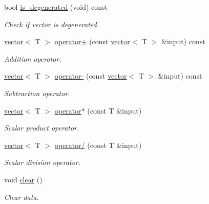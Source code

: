 \begin{DoxyCompactItemize}
\mbox{\label{classddd_1_1vector_a4546f9e060850aca9f10246ec5283d4e}} 
bool \hyperlink{classddd_1_1vector_a4546f9e060850aca9f10246ec5283d4e}{is\+\_\+degenerated} (void) const
\begin{DoxyCompactList}\small\item\em Check if vector is degenerated. \end{DoxyCompactList}\item 
\hyperlink{classddd_1_1vector}{vector}$<$ T $>$ \hyperlink{classddd_1_1vector_a03e9624cbd1f3fa29247c1a67a8678d9}{operator+} (const \hyperlink{classddd_1_1vector}{vector}$<$ T $>$ \&input) const
\begin{DoxyCompactList}\small\item\em Addition operator. \end{DoxyCompactList}\item 
\hyperlink{classddd_1_1vector}{vector}$<$ T $>$ \hyperlink{classddd_1_1vector_aa047958a3d0cf3d3ff3d6ff571920ae0}{operator-\/} (const \hyperlink{classddd_1_1vector}{vector}$<$ T $>$ \&input) const
\begin{DoxyCompactList}\small\item\em Subtraction operator. \end{DoxyCompactList}\item 
\hyperlink{classddd_1_1vector}{vector}$<$ T $>$ \hyperlink{classddd_1_1vector_a9ba05f9c13f8d9cd23f5a5657fcfa948}{operator$\ast$} (const T \&input)
\begin{DoxyCompactList}\small\item\em Scalar product operator. \end{DoxyCompactList}\item 
\hyperlink{classddd_1_1vector}{vector}$<$ T $>$ \hyperlink{classddd_1_1vector_a837824860826c44950c2c48d4bd247e3}{operator/} (const T \&input)
\begin{DoxyCompactList}\small\item\em Scalar division operator. \end{DoxyCompactList}\item 
\mbox{\label{classddd_1_1vector_a5c313955b405726c4c941f621a44b5c6}} 
void \hyperlink{classddd_1_1vector_a5c313955b405726c4c941f621a44b5c6}{clear} ()
\begin{DoxyCompactList}\small\item\em Clear data. \end{DoxyCompactList}\item 

\end{DoxyCompactItemize}
